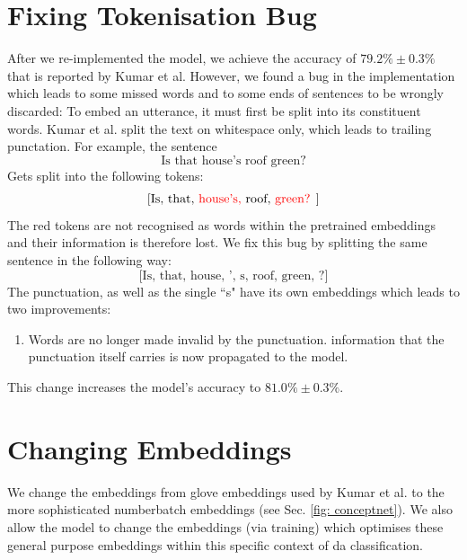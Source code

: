     \section{Fixing Tokenisation Bug}
        After we re-implemented the \gls{model}, we achieve the accuracy of $79.2\% \pm 0.3\%$ that is reported by Kumar et al. However, we found a bug in the implementation which leads to some missed words and to some ends of sentences to be wrongly discarded: To embed an \gls{utterance}, it must first be split into its constituent words. Kumar et al. split the text on whitespace only, which leads to trailing punctation. For example, the sentence
        \begin{equation*}
            \text{Is that house's roof green?}
        \end{equation*}
        Gets split into the following tokens:
        \begin{equation*}
            \text{[Is, that, \color{red} house's, \color{black} roof, \color{red} green? \color{black}]}
        \end{equation*}
        The red tokens are not recognised as words within the pretrained \glspl{embedding} and their information is therefore lost. We fix this bug by splitting the same sentence in the following way:
        \begin{equation*}
            \text{[Is, that, house, ', s, roof, green, ?]}
        \end{equation*}
        The punctuation, as well as the single ``s" have its own \glspl{embedding} which leads to two improvements:
        \begin{enumerate}
            \item Words are no longer made invalid by the punctuation.
            \The information that the punctuation itself carries is now propagated to the \gls{model}.
        \end{enumerate}
        This change increases the \gls{model}'s accuracy to $81.0\% \pm 0.3\%$.



    \section{Changing Embeddings}
    We change the \glspl{embedding} from \gls{glove} \glspl{embedding} used by Kumar et al.\cite{kumar2017dialogue} to the more sophisticated \gls{numberbatch} \glspl{embedding} (see Sec. \ref{fig: conceptnet}). We also allow the \gls{model} to change the \glspl{embedding} (via training) which optimises these general purpose \glspl{embedding} within this specific context of \gls{da} classification.


